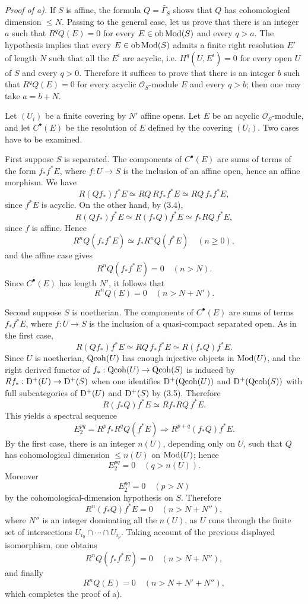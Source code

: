 \documentclass[11pt]{article}
\begin{document}
\emph{Proof of a).} If $S$ is affine, the formula $Q=\widetilde{\Gamma_S}$ shows that $Q$ has cohomological dimension $\leq N$. Passing to the general case, let us prove that there is an integer $a$ such that $R^qQ(E)=0$ for every $E\in\operatorname{ob}\operatorname{Mod}(S)$ and every $q>a$. The hypothesis implies that every $E\in\operatorname{ob}\operatorname{Mod}(S)$ admits a finite right resolution $E'$ of length $N$ such that all the $E^i$ are acyclic, i.e. $H^q(U,E^i)=0$ for every open $U$ of $S$ and every $q>0$. Therefore it suffices to prove that there is an integer $b$ such that $R^qQ(E)=0$ for every acyclic $\mathcal O_S$-module $E$ and every $q>b$; then one may take $a=b+N$.

Let $(U_i)$ be a finite covering by $N'$ affine opens. Let $E$ be an acyclic $\mathcal O_S$-module, and let $C^\bullet(E)$ be the resolution of $E$ defined by the covering $(U_i)$. Two cases have to be examined.

First suppose $S$ is separated. The components of $C^\bullet(E)$ are sums of terms of the form $f_*f^*E$, where $f:U\to S$ is the inclusion of an affine open, hence an affine morphism. We have
\[
R(Qf_*)f^*E\simeq RQ\,Rf_*f^*E\simeq RQ\,f_*f^*E,
\]
since $f^*E$ is acyclic. On the other hand, by (3.4),
\[
R(Qf_*)f^*E\simeq R(f_*Q)f^*E\simeq f_*RQ\,f^*E,
\]
since $f$ is affine. Hence
\[
R^nQ(f_*f^*E)\simeq f_*R^nQ(f^*E)\quad(n\geq0),
\]
and the affine case gives
\[
R^nQ(f_*f^*E)=0\quad(n>N).
\]
Since $C^\bullet(E)$ has length $N'$, it follows that
\[
R^nQ(E)=0\quad(n>N+N').
\]

Second suppose $S$ is noetherian. The components of $C^\bullet(E)$ are sums of terms $f_*f^*E$, where $f:U\to S$ is the inclusion of a quasi-compact separated open. As in the first case,
\[
R(Qf_*)f^*E\simeq RQ\,f_*f^*E\simeq R(f_*Q)f^*E.
\]
Since $U$ is noetherian, $\operatorname{Qcoh}(U)$ has enough injective objects in $\operatorname{Mod}(U)$, and the right derived functor of $f_*:\operatorname{Qcoh}(U)\to\operatorname{Qcoh}(S)$ is induced by $Rf_*:\mathrm D^+(U)\to\mathrm D^+(S)$ when one identifies $\mathrm D^+(\operatorname{Qcoh}(U))$ and $\mathrm D^+(\operatorname{Qcoh}(S))$ with full subcategories of $\mathrm D^+(U)$ and $\mathrm D^+(S)$ by (3.5). Therefore
\[
R(f_*Q)f^*E\simeq Rf_*RQ\,f^*E.
\]
This yields a spectral sequence
\[
E_2^{pq}=R^pf_*R^qQ(f^*E)\Longrightarrow R^{p+q}(f_*Q)f^*E.
\]
By the first case, there is an integer $n(U)$, depending only on $U$, such that $Q$ has cohomological dimension $\leq n(U)$ on $\operatorname{Mod}(U)$; hence
\[
E_2^{pq}=0\quad(q>n(U)).
\]
Moreover
\[
E_2^{pq}=0\quad(p>N)
\]
by the cohomological-dimension hypothesis on $S$. Therefore
\[
R^n(f_*Q)f^*E=0\quad(n>N+N''),
\]
where $N''$ is an integer dominating all the $n(U)$, as $U$ runs through the finite set of intersections $U_{i_0}\cap\cdots\cap U_{i_p}$. Taking account of the previous displayed isomorphism, one obtains
\[
R^nQ(f_*f^*E)=0\quad(n>N+N''),
\]
and finally
\[
R^nQ(E)=0\quad(n>N+N'+N''),
\]
which completes the proof of a).
\end{document}
